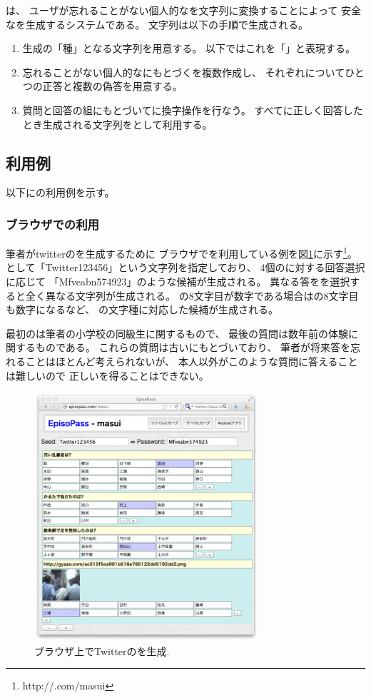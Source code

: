 \documentclass[twoside]{wiss}
\begin{document}
{\EP}は、
ユーザが忘れることがない個人的な{\EM}を文字列に変換することによって
安全な{\PW}を生成するシステムである。
{\PW}文字列は以下の手順で生成される。

\begin{enumerate}
\item {\PW}生成の「種」となる文字列を用意する。
以下ではこれを「{\SS}」と表現する。
\item 忘れることがない個人的な{\EM}にもとづく{\SQ}を複数作成し、
それぞれについてひとつの正答と複数の偽答を用意する。
\item 質問と回答の組にもとづいて{\SS}に換字操作を行なう。
すべてに正しく回答したとき生成される文字列を{\PW}として利用する。
\end{enumerate}

\subsection{{\EP}利用例}

以下に{\EP}の利用例を示す。

\subsubsection{ブラウザでの利用}

筆者がtwitterの{\PW}を生成するために
ブラウザで{\EP}を利用している例を図\ref{web1}に示す\footnote{
  \textsf{http://{\EP}.com/masui}
}。
{\SS}として「\textsf{Twitter123456}」という文字列を指定しており、
4個の{\SQ}に対する回答選択に応じて
「\textsf{Mfveabn574923}」のような{\PW}候補が生成される。
異なる答をを選択すると全く異なる文字列が生成される。
{\SS}の8文字目が数字である場合は{\PW}の8文字目も数字になるなど、
{\SS}の文字種に対応した{\PW}候補が生成される。

最初の{\SQ}は筆者の小学校の同級生に関するもので、
最後の質問は数年前の体験に関するものである。
これらの質問は古い{\EM}にもとづいており、
筆者が将来答を忘れることはほとんど考えられないが、
本人以外がこのような質問に答えることは難しいので
正しい{\PW}を得ることはできない。

\begin{figure}[H]
\centerline{\includegraphics[width=83mm,bb=0 0 718 796]{figures/785ff09b4233804d2ec89c3af71ee5d0.png}}
\caption{ブラウザ上でTwitterの{\PW}を生成.}
\label{web1}
\end{figure}
\end{document}

